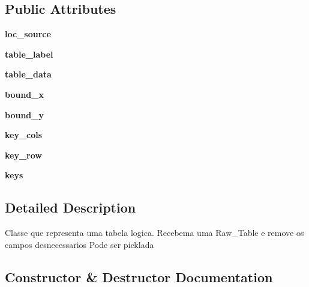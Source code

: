 \subsection*{Public Attributes}
\begin{DoxyCompactItemize}
\item 
\mbox{\label{class_tabela_1_1_table_ab9ebb4ae6437d100c1ebdf046fa43bff}} 
{\bfseries loc\+\_\+source}
\item 
\mbox{\label{class_tabela_1_1_table_acf4034972f8ca45d84f255eee35be31d}} 
{\bfseries table\+\_\+label}
\item 
\mbox{\label{class_tabela_1_1_table_a8f4f53b31818b05a2d512a4ffe670ed3}} 
{\bfseries table\+\_\+data}
\item 
\mbox{\label{class_tabela_1_1_table_a6d45ff17a28fa07c40cebc2af231a645}} 
{\bfseries bound\+\_\+x}
\item 
\mbox{\label{class_tabela_1_1_table_ac28a8176c31fa193847311967c5d993a}} 
{\bfseries bound\+\_\+y}
\item 
\mbox{\label{class_tabela_1_1_table_a38f8e9cd9b88c014664c0d908f8b931c}} 
{\bfseries key\+\_\+cols}
\item 
\mbox{\label{class_tabela_1_1_table_a8432925ee02ec678d2b2f823749c85bb}} 
{\bfseries key\+\_\+row}
\item 
\mbox{\label{class_tabela_1_1_table_a3528cb5d55a61bad4dba988b698445f2}} 
{\bfseries keys}
\end{DoxyCompactItemize}


\subsection{Detailed Description}
\begin{DoxyVerb}Classe que representa uma tabela logica. Recebema uma Raw_Table e remove os campos desnecessarios Pode ser picklada\end{DoxyVerb}
 

\subsection{Constructor \& Destructor Documentation}
\mbox{\label{class_tabela_1_1_table_a10c29642d83aa4daf8124db325f0a761}} 

